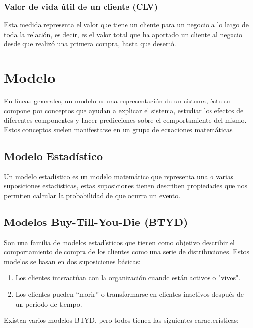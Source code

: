 \subsubsection{Valor de vida útil de un cliente (CLV)}

Esta medida representa el valor que tiene un cliente para un negocio a lo largo de toda la relación, es decir, es el valor total que ha aportado un cliente al negocio desde que realizó una primera compra, hasta que desertó.

\section{Modelo}

En líneas generales, un modelo es una representación de un sistema, éste se compone por conceptos que ayudan a explicar el sistema, estudiar los efectos de diferentes componentes y hacer predicciones sobre el comportamiento del mismo. Estos conceptos suelen manifestarse en un grupo de ecuaciones matemáticas.

\subsection{Modelo Estadístico}

Un modelo estadístico es un modelo matemático que representa una o varias suposiciones estadísticas, estas suposiciones tienen describen propiedades que nos permiten calcular la probabilidad de que ocurra un evento.

\subsection{Modelos Buy-Till-You-Die (BTYD)}

Son una familia de modelos estadísticos que tienen como objetivo describir el comportamiento de compra de los clientes como una serie de distribuciones. Estos modelos se basan en dos suposiciones básicas:

\begin{enumerate}
	\item Los clientes interactúan con la organización cuando están activos o "vivos".
	\item Los clientes pueden “morir” o transformarse en clientes inactivos después de un periodo de tiempo.
\end{enumerate}

Existen varios modelos BTYD, pero todos tienen las siguientes características:

